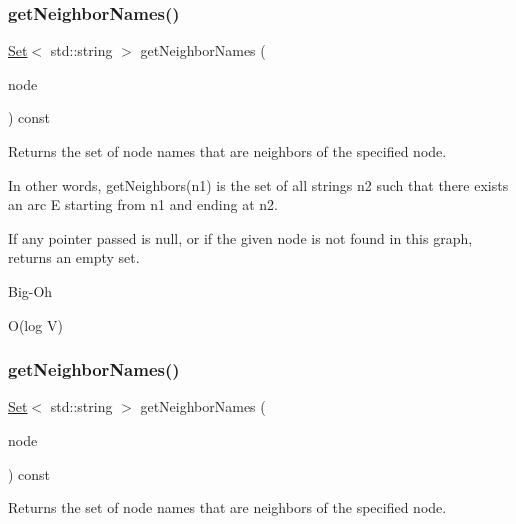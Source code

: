 \subsubsection{\texorpdfstring{get\+Neighbor\+Names()}{getNeighborNames()}\hspace{0.1cm}{\footnotesize\ttfamily [1/2]}}
{\footnotesize\ttfamily \mbox{\hyperlink{classSet}{Set}}$<$ std\+::string $>$ get\+Neighbor\+Names (\begin{DoxyParamCaption}\item[{\mbox{\hyperlink{classVertexGen}{Vertex\+Gen}}$<$ V, E $>$  $\ast$}]{node }\end{DoxyParamCaption}) const\hspace{0.3cm}{\ttfamily [inherited]}}



Returns the set of node names that are neighbors of the specified node. 

In other words, get\+Neighbors(n1) is the set of all strings n2 such that there exists an arc E starting from n1 and ending at n2.

If any pointer passed is null, or if the given node is not found in this graph, returns an empty set. \begin{DoxyRefDesc}{Big-\/\+Oh}
\item[\mbox{\hyperlink{BigOh__BigOh000071}{Big-\/\+Oh}}]O(log V) \end{DoxyRefDesc}
\mbox{\label{classGraph_a6175b4d672266465dd34e070c7710b34}} 
\subsubsection{\texorpdfstring{get\+Neighbor\+Names()}{getNeighborNames()}\hspace{0.1cm}{\footnotesize\ttfamily [2/2]}}
{\footnotesize\ttfamily \mbox{\hyperlink{classSet}{Set}}$<$ std\+::string $>$ get\+Neighbor\+Names (\begin{DoxyParamCaption}\item[{const std\+::string \&}]{node }\end{DoxyParamCaption}) const\hspace{0.3cm}{\ttfamily [inherited]}}



Returns the set of node names that are neighbors of the specified node. 

